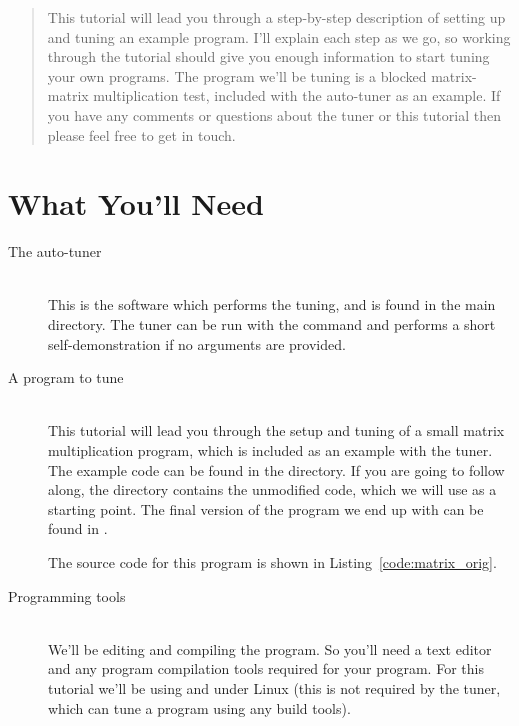 \documentclass[a4paper]{article}
\begin{document}
\maketitle

\begin{abstract}
This tutorial will lead you through a step-by-step description of setting up 
and tuning an example program. 
I'll explain each step as we go, so working through the tutorial should give 
you enough information to start tuning your own programs.
The program we'll be tuning is a blocked matrix-matrix multiplication test, 
included with the auto-tuner as an example.
If you have any comments or questions about the tuner or this tutorial then 
please feel free to get in touch.
\end{abstract}

\tableofcontents



\newpage

\section{What You'll Need}
\begin{description}
\item[The auto-tuner] \hfill\\
This is the software which performs the tuning, and is found in the 
main  directory. The tuner can be run with the command 
 and performs a short 
self-demonstration if no arguments are provided.

\item[A program to tune] \hfill\\
This tutorial will lead you through the setup and 
tuning of a small matrix multiplication program, which is included as an 
example with the tuner. The example code can be found in the 
 directory. If you are going to follow along, the 
 directory contains the unmodified code, 
which we will use as a starting point. The final version of the program we end 
up with can be found in .

The source code for this program is shown in Listing~\ref{code:matrix_orig}.

\item[Programming tools] \hfill\\
We'll be editing and compiling the program. So you'll need a text 
editor and any program compilation tools required for your program. For this 
tutorial we'll be using  and  under Linux (this is 
not required by the tuner, which can tune a program using any build tools).

\end{description}
\end{document}
